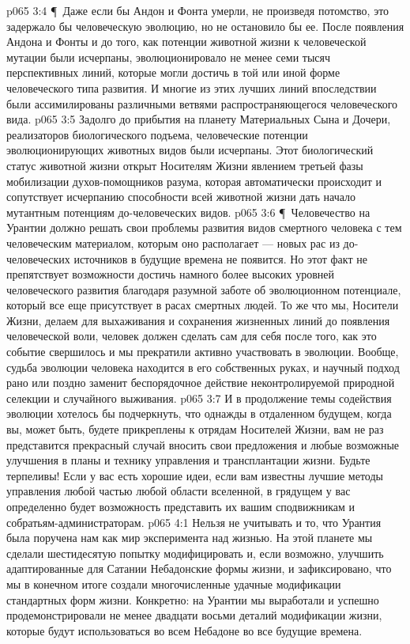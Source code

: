\vs p065 3:4 \P\ Даже если бы Андон и Фонта умерли, не произведя потомство, это задержало бы человеческую эволюцию, но не остановило бы ее. После появления Андона и Фонты и до того, как потенции животной жизни к человеческой мутации были исчерпаны, эволюционировало не менее семи тысяч перспективных линий, которые могли достичь в той или иной форме человеческого типа развития. И многие из этих лучших линий впоследствии были ассимилированы различными ветвями распространяющегося человеческого вида.
\vs p065 3:5 Задолго до прибытия на планету Материальных Сына и Дочери, реализаторов биологического подъема, человеческие потенции эволюционирующих животных видов были исчерпаны. Этот биологический статус животной жизни открыт Носителям Жизни явлением третьей фазы мобилизации духов\hyp{}помощников разума, которая автоматически происходит и сопутствует исчерпанию способности всей животной жизни дать начало мутантным потенциям до\hyp{}человеческих видов.
\vs p065 3:6 \P\ Человечество на Урантии должно решать свои проблемы развития видов смертного человека с тем человеческим материалом, которым оно располагает --- новых рас из до\hyp{}человеческих источников в будущие времена не появится. Но этот факт не препятствует возможности достичь намного более высоких уровней человеческого развития благодаря разумной заботе об эволюционном потенциале, который все еще присутствует в расах смертных людей. То же что мы, Носители Жизни, делаем для выхаживания и сохранения жизненных линий до появления человеческой воли, человек должен сделать сам для себя после того, как это событие свершилось и мы прекратили активно участвовать в эволюции. Вообще, судьба эволюции человека находится в его собственных руках, и научный подход рано или поздно заменит беспорядочное действие неконтролируемой природной селекции и случайного выживания.
\vs p065 3:7 И в продолжение темы содействия эволюции хотелось бы подчеркнуть, что однажды в отдаленном будущем, когда вы, может быть, будете прикреплены к отрядам Носителей Жизни, вам не раз представится прекрасный случай вносить свои предложения и любые возможные улучшения в планы и технику управления и трансплантации жизни. Будьте терпеливы! Если у вас есть хорошие идеи, если вам известны лучшие методы управления любой частью любой области вселенной, в грядущем у вас определенно будет возможность представить их вашим сподвижникам и собратьям\hyp{}администраторам.
\vs p065 4:1 Нельзя не учитывать и то, что Урантия была поручена нам как мир эксперимента над жизнью. На этой планете мы сделали шестидесятую попытку модифицировать и, если возможно, улучшить адаптированные для Сатании Небадонские формы жизни, и зафиксировано, что мы в конечном итоге создали многочисленные удачные модификации стандартных форм жизни. Конкретно: на Урантии мы выработали и успешно продемонстрировали не менее двадцати восьми деталий модификации жизни, которые будут использоваться во всем Небадоне во все будущие времена.

